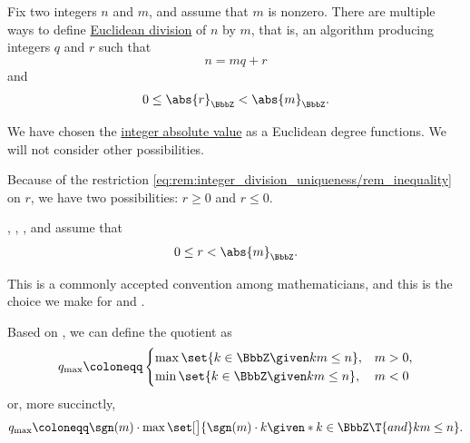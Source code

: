 \begin{remark}\label{rem:integer_division_uniqueness}
  Fix two integers \( n \) and \( m \), and assume that \( m \) is nonzero. There are multiple ways to define \hyperref[def:euclidean_domain]{Euclidean division} of \( n \) by \( m \), that is, an algorithm producing integers \( q \) and \( r \) such that
  \begin{equation*}
    n = mq + r
  \end{equation*}
  and
  \begin{equation}\label{eq:rem:integer_division_uniqueness/rem_inequality}
    0 \leq \abs{r}_\BbbZ < \abs{m}_\BbbZ.
  \end{equation}

  We have chosen the \hyperref[def:integer_absolute_value]{integer absolute value} as a Euclidean degree functions. We will not consider other possibilities.

  Because of the restriction \eqref{eq:rem:integer_division_uniqueness/rem_inequality} on \( r \), we have two possibilities: \( r \geq 0 \) and \( r \leq 0 \).

  \begin{thmenum}
     \textcite[23]{Jacobson1985BasicAlgebraI}, \textcite[thm. A-2.2]{Rotman2015AdvancedModernAlgebraPart1}, \textcite[prop. 1.1]{Knapp2016BasicAlgebra}, \textcite[83]{Aluffi2009Algebra} and \textcite[sec. 2.12]{Тыртышников2007ЛинейнаяАлгебра} assume that
    \begin{equation*}
      0 \leq r < \abs{m}_\BbbZ.
    \end{equation*}

    This is a commonly accepted convention among mathematicians, and this is the choice we make for  and \cite{notebook:code}.

    Based on \cite[prop. 1.1]{Knapp2016BasicAlgebra}, we can define the quotient as
    \begin{equation}\label{eq:rem:integer_division_uniqueness/max/q_cases}
      q_{\max} \coloneqq \begin{cases}
        \max\set{ k \in \BbbZ \given km \leq n }, &m > 0, \\
        \min\set{ k \in \BbbZ \given km \leq n }, &m < 0
      \end{cases}
    \end{equation}
    or, more succinctly,
    \begin{equation}\label{eq:rem:integer_division_uniqueness/max/q}
      q_{\max} \coloneqq \sgn(m) \cdot \max\set[\big]{ \sgn(m) \cdot k \given* k \in \BbbZ \T{and} km \leq n }.
    \end{equation}


\end{thmenum}
\end{remark}
